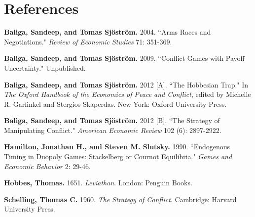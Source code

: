 \documentclass[12pt,english]{article}
\begin{document}




\clearpage

\section*{References} \label{sec:appendixa}

\noindent
\hangindent 12pt
\textbf{Baliga, Sandeep, and Tomas Sj\"ostr\"om.} 2004. ``Arms Races and Negotiations." \textit{Review of Economic Studies} 71: 351-369.

\noindent
\hangindent 12pt
\textbf{Baliga, Sandeep, and Tomas Sj\"ostr\"om.} 2009. ``Conflict Games with Payoff Uncertainty." Unpublished.

\noindent
\hangindent 12pt
\textbf{Baliga, Sandeep, and Tomas Sj\"ostr\"om.} 2012 [A]. ``The Hobbesian Trap." In \textit{The Oxford Handbook of the Economics of Peace and Conflict}, edited by Michelle R. Garfinkel and Stergios Skaperdas. New York: Oxford University Press.

\noindent
\hangindent 12pt
\textbf{Baliga, Sandeep, and Tomas Sj\"ostr\"om.} 2012 [B]. ``The Strategy of Manipulating Conflict." \textit{American Economic Review} 102 (6): 2897-2922.

\noindent
\hangindent 12pt
\textbf{Hamilton, Jonathan H., and Steven M. Slutsky.} 1990. ``Endogenous Timing in Duopoly Games: Stackelberg or Cournot Equilibria." \textit{Games and Economic Behavior} 2: 29-46.

\noindent
\hangindent 12pt
\textbf{Hobbes, Thomas.} 1651. \textit{Leviathan}. London: Penguin Books.







\noindent
\hangindent 12pt
\textbf{Schelling, Thomas C.} 1960. \textit{The Strategy of Conflict}. Cambridge: Harvard University Press.
\end{document}
